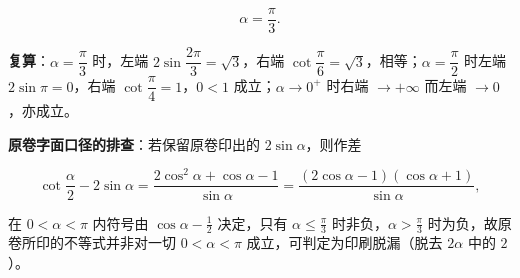 \begin{answer}
\nopagebreak[4]
\[
\alpha=\frac{\pi}{3}.
\]

\textbf{复算}：$\alpha=\dfrac{\pi}{3}$ 时，左端 $2\sin\dfrac{2\pi}{3}=\sqrt3$，右端 $\cot\dfrac{\pi}{6}=\sqrt3$，相等；$\alpha=\dfrac{\pi}{2}$ 时左端 $2\sin\pi=0$，右端 $\cot\dfrac\pi4=1$，$0<1$ 成立；$\alpha\to0^+$ 时右端 $\to+\infty$ 而左端 $\to0$，亦成立。

\textbf{原卷字面口径的排查}：若保留原卷印出的 $2\sin\alpha$，则作差

\nopagebreak[4]
\[
\cot\frac{\alpha}{2}-2\sin\alpha=\frac{2\cos^2\alpha+\cos\alpha-1}{\sin\alpha}=\frac{(2\cos\alpha-1)(\cos\alpha+1)}{\sin\alpha},
\]

在 $0<\alpha<\pi$ 内符号由 $\cos\alpha-\frac12$ 决定，只有 $\alpha\leqslant\frac{\pi}{3}$ 时非负，$\alpha>\frac{\pi}{3}$ 时为负，故原卷所印的不等式并非对一切 $0<\alpha<\pi$ 成立，可判定为印刷脱漏（脱去 $2\alpha$ 中的 $2$）。


\end{answer}
